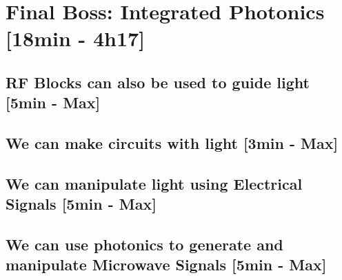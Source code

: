
\section{Final Boss: Integrated Photonics [18min - 4h17]}
\subsection{RF Blocks can also be used to guide light [5min - Max]}
\subsection{We can make circuits with light [3min - Max]}
\subsection{We can manipulate light using Electrical Signals [5min - Max]}
\subsection{We can use photonics to generate and manipulate Microwave Signals [5min - Max]}
